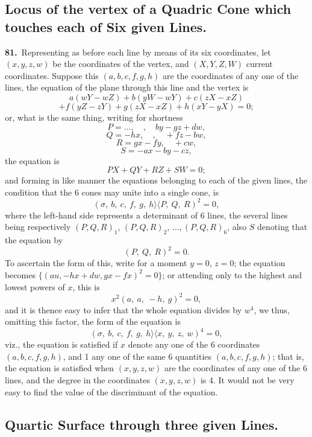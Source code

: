 \documentclass[11pt,a4paper]{article}
\newcommand{\bw}{\mathrel{\rangle\!\langle}}
\begin{document}
\newpage
\setcounter{page}{164}

\subsection*{Locus of the vertex of a Quadric Cone which touches each of Six given Lines.}

\noindent\textbf{81.}\ Representing as before each line by means of its six coordinates, let $(x, y, z, w)$ be the coordinates of the vertex, and $(X, Y, Z, W)$ current coordinates. Suppose this $(a, b, c, f, g, h)$ are the coordinates of any one of the lines, the equation of the plane through this line and the vertex is
\[
a(wY - wZ) + b(yW - wY) + c(zX - xZ)
\]
\[
+ f(yZ - zY) + g(zX - xZ) + h(xY - yX) = 0;
\]
or, what is the same thing, writing for shortness
\[
P = \ldots,\quad ,\quad by - gz + dw,
\]
\[
Q = -hx,\quad ,\quad + fz - bw,
\]
\[
R = gx - fy,\quad + cw,
\]
\[
S = -ax - by - cz,
\]
the equation is
\[
PX + QY + RZ + SW = 0;
\]
and forming in like manner the equations belonging to each of the given lines, the condition that the 6 cones may unite into a single cone, is
\[
(\sigma,\ b,\ c,\ f,\ g,\ h \bw P,\ Q,\ R)^2 = 0,
\]
where the left-hand side represents a determinant of 6 lines, the several lines being respectively $(P, Q, R)_1$, $(P, Q, R)_2$, $\ldots, (P, Q, R)_6$, also $S$ denoting that the equation by
\[
(P,\ Q,\ R)^2 = 0.
\]
To ascertain the form of this, write for a moment $y = 0$, $z = 0$; the equation becomes $\{(au, -hx + dw, gx - fx)^2 = 0\}$; or attending only to the highest and lowest powers of $x$, this is
\[
x^2(a,\ a,\ -h,\ g)^2 = 0,
\]
and it is thence easy to infer that the whole equation divides by $w^4$, we thus, omitting this factor, the form of the equation is
\[
(\sigma,\ b,\ c,\ f,\ g,\ h \bw x,\ y,\ z,\ w)^4 = 0,
\]
viz., the equation is satisfied if $x$ denote any one of the 6 coordinates $(a, b, c, f, g, h)$, and 1 any one of the same 6 quantities $(a, b, c, f, g, h)$; that is, the equation is satisfied when $(x, y, z, w)$ are the coordinates of any one of the 6 lines, and the degree in the coordinates $(x, y, z, w)$ is 4. It would not be very easy to find the value of the discriminant of the equation.

\newpage
\setcounter{page}{165}

\subsection*{Quartic Surface through three given Lines.}
\end{document}
